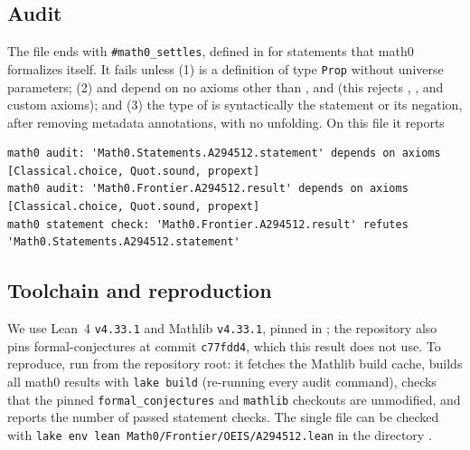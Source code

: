 \documentclass[11pt]{amsart}
\theoremstyle{plain}
\theoremstyle{definition}
\begin{document}
\subsection*{Audit}
The file ends with \texttt{\#math0\_settles}, defined in  for statements that math0 formalizes itself. It fails unless (1)  is a definition of type \texttt{Prop} without universe parameters; (2)  and  depend on no axioms other than ,  and  (this rejects , ,  and custom axioms); and (3) the type of  is syntactically the statement or its negation, after removing metadata annotations, with no unfolding. On this file it reports
\begin{lstlisting}
math0 audit: 'Math0.Statements.A294512.statement' depends on axioms [Classical.choice, Quot.sound, propext]
math0 audit: 'Math0.Frontier.A294512.result' depends on axioms [Classical.choice, Quot.sound, propext]
math0 statement check: 'Math0.Frontier.A294512.result' refutes 'Math0.Statements.A294512.statement'
\end{lstlisting}

\subsection*{Toolchain and reproduction}
We use Lean~4 \cite{Lean4} \texttt{v4.33.1} and Mathlib \cite{Mathlib} \texttt{v4.33.1}, pinned in ; the repository also pins formal-conjectures \cite{FC} at commit \texttt{c77fdd4}, which this result does not use.
To reproduce, run  from the repository root: it fetches the Mathlib build cache, builds all math0 results with \texttt{lake build} (re-running every audit command), checks that the pinned \texttt{formal\_conjectures} and \texttt{mathlib} checkouts are unmodified, and reports the number of passed statement checks. The single file can be checked with \texttt{lake env lean Math0/Frontier/OEIS/A294512.lean} in the directory .
\end{document}

